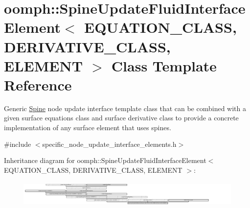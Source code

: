 \hypertarget{classoomph_1_1SpineUpdateFluidInterfaceElement}{}\section{oomph\+:\+:Spine\+Update\+Fluid\+Interface\+Element$<$ E\+Q\+U\+A\+T\+I\+O\+N\+\_\+\+C\+L\+A\+SS, D\+E\+R\+I\+V\+A\+T\+I\+V\+E\+\_\+\+C\+L\+A\+SS, E\+L\+E\+M\+E\+NT $>$ Class Template Reference}
\label{classoomph_1_1SpineUpdateFluidInterfaceElement}


Generic \hyperlink{classoomph_1_1Spine}{Spine} node update interface template class that can be combined with a given surface equations class and surface derivative class to provide a concrete implementation of any surface element that uses spines.  




{\ttfamily \#include $<$specific\+\_\+node\+\_\+update\+\_\+interface\+\_\+elements.\+h$>$}

Inheritance diagram for oomph\+:\+:Spine\+Update\+Fluid\+Interface\+Element$<$ E\+Q\+U\+A\+T\+I\+O\+N\+\_\+\+C\+L\+A\+SS, D\+E\+R\+I\+V\+A\+T\+I\+V\+E\+\_\+\+C\+L\+A\+SS, E\+L\+E\+M\+E\+NT $>$\+:\begin{figure}[H]
\begin{center}
\leavevmode
\includegraphics[height=1.331070cm]{classoomph_1_1SpineUpdateFluidInterfaceElement}
\end{center}
\end{figure}
